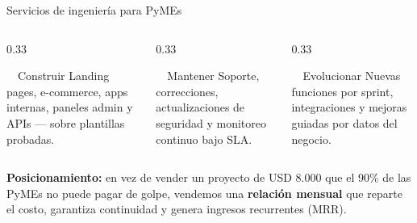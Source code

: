 \documentclass[aspectratio=169,10pt]{beamer}
\begin{document}
\begin{frame}{Servicios de ingeniería para PyMEs}
  \vspace{0.2em}
  \begin{columns}[T]
    \begin{column}{0.33\textwidth}
      \begin{hcard}[wink]{\faLaptopCode~~Construir}
        \small Landing pages, e-commerce, apps internas, paneles admin y APIs — sobre plantillas probadas.
      \end{hcard}
    \end{column}
    \begin{column}{0.33\textwidth}
      \begin{hcard}[wcyan]{\faSync~~Mantener}
        \small Soporte, correcciones, actualizaciones de seguridad y monitoreo continuo bajo SLA.
      \end{hcard}
    \end{column}
    \begin{column}{0.33\textwidth}
      \begin{hcard}[wmint]{\faChartLine~~Evolucionar}
        \small Nuevas funciones por sprint, integraciones y mejoras guiadas por datos del negocio.
      \end{hcard}
    \end{column}
  \end{columns}
  \vspace{10pt}
  \begin{tcolorbox}[wfill=wink]
    \small \textbf{Posicionamiento:} en vez de vender un proyecto de USD 8.000 que el 90\% de las PyMEs no puede pagar de golpe, vendemos una \textbf{relación mensual} que reparte el costo, garantiza continuidad y genera ingresos recurrentes (MRR).
  \end{tcolorbox}
\end{frame}
\end{document}
